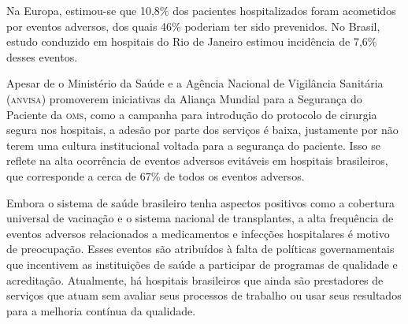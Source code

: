 \documentclass{article}
\begin{document}
Na Europa, estimou-se que 10,8\% dos pacientes hospitalizados foram acometidos por eventos
        adversos, dos quais 46\% poderiam ter sido prevenidos. %
 No Brasil, estudo conduzido em hospitais do Rio de Janeiro estimou incidência de
        7,6\% desses eventos. %


Apesar de o Ministério da Saúde e a Agência Nacional de Vigilância Sanitária (\textsc{anvisa})
        promoverem iniciativas da Aliança Mundial para a Segurança do Paciente da \textsc{oms}, como a
        campanha para introdução do protocolo de cirurgia segura nos hospitais, a adesão por parte
        dos serviços é baixa, justamente por não terem uma cultura institucional voltada para a
        segurança do paciente. Isso se reflete na alta ocorrência de eventos adversos evitáveis em
        hospitais brasileiros, que corresponde a cerca de 67\% de todos os eventos adversos. %


Embora o sistema de saúde brasileiro tenha aspectos positivos como a cobertura universal de
        vacinação e o sistema nacional de transplantes, a alta frequência de eventos adversos
        relacionados a medicamentos e infecções hospitalares é motivo de preocupação. %
 Esses eventos são atribuídos à falta de políticas governamentais %
 que incentivem as instituições de saúde a participar de programas de qualidade e
        acreditação. %
 Atualmente, há hospitais brasileiros que ainda são prestadores de serviços que atuam
        sem avaliar seus processos de trabalho ou usar seus resultados para a melhoria contínua da
        qualidade. %
\end{document}
